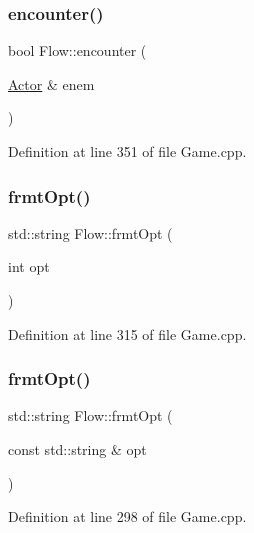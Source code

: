 \subsubsection{\texorpdfstring{encounter()}{encounter()}}
{\footnotesize\ttfamily bool Flow\+::encounter (\begin{DoxyParamCaption}\item[{\hyperlink{class_flow_1_1_actor}{Actor} \&}]{enem }\end{DoxyParamCaption})}



Definition at line 351 of file Game.\+cpp.

\hypertarget{namespace_flow_ac5fc50f86c5fa7345f2ef52daa16c086}{}\label{namespace_flow_ac5fc50f86c5fa7345f2ef52daa16c086} 
\subsubsection{\texorpdfstring{frmt\+Opt()}{frmtOpt()}\hspace{0.1cm}{\footnotesize\ttfamily [1/2]}}
{\footnotesize\ttfamily std\+::string Flow\+::frmt\+Opt (\begin{DoxyParamCaption}\item[{int}]{opt }\end{DoxyParamCaption})}



Definition at line 315 of file Game.\+cpp.

\hypertarget{namespace_flow_a6b0b50aaa0c160e4c79cfcaea58010db}{}\label{namespace_flow_a6b0b50aaa0c160e4c79cfcaea58010db} 
\subsubsection{\texorpdfstring{frmt\+Opt()}{frmtOpt()}\hspace{0.1cm}{\footnotesize\ttfamily [2/2]}}
{\footnotesize\ttfamily std\+::string Flow\+::frmt\+Opt (\begin{DoxyParamCaption}\item[{const std\+::string \&}]{opt }\end{DoxyParamCaption})}



Definition at line 298 of file Game.\+cpp.

\hypertarget{namespace_flow_a37add817bd1f0f674074844aa9c71a03}{}\label{namespace_flow_a37add817bd1f0f674074844aa9c71a03} 
